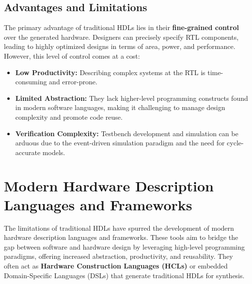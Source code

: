 \documentclass[sigconf, anonymous=false]{acmart} %
\begin{document}
\subsection{Advantages and Limitations}
The primary advantage of traditional HDLs lies in their \textbf{fine-grained control} over the generated hardware. Designers can precisely specify RTL components, leading to highly optimized designs in terms of area, power, and performance. However, this level of control comes at a cost:
\begin{itemize}
    \item \textbf{Low Productivity:} Describing complex systems at the RTL is time-consuming and error-prone.
    \item \textbf{Limited Abstraction:} They lack higher-level programming constructs found in modern software languages, making it challenging to manage design complexity and promote code reuse.
    \item \textbf{Verification Complexity:} Testbench development and simulation can be arduous due to the event-driven simulation paradigm and the need for cycle-accurate models.
\end{itemize}

\section{Modern Hardware Description Languages and Frameworks}
\label{sec:modern_hdls}
The limitations of traditional HDLs have spurred the development of modern hardware description languages and frameworks. These tools aim to bridge the gap between software and hardware design by leveraging high-level programming paradigms, offering increased abstraction, productivity, and reusability. They often act as \textbf{Hardware Construction Languages (HCLs)} or embedded Domain-Specific Languages (DSLs) that generate traditional HDLs for synthesis.
\end{document}
